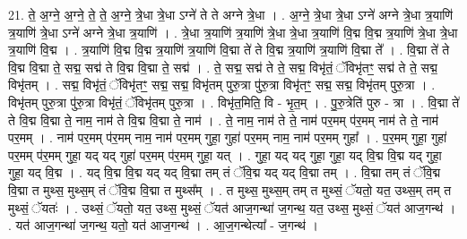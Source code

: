 \documentclass[17pt]{extarticle}
\begin{document}
21. ते॒ अ॒ग्ने॒ अ॒ग्ने॒ ते॒ ते॒ अ॒ग्ने॒ त्रे॒धा त्रे॒धा ऽग्ने॑ ते ते अग्ने त्रे॒धा । . अ॒ग्ने॒ त्रे॒धा त्रे॒धा ऽग्ने॑ अग्ने त्रे॒धा त्र॒याणि॑ त्र॒याणि॑ त्रे॒धा ऽग्ने॑ अग्ने त्रे॒धा त्र॒याणि॑ । . त्रे॒धा त्र॒याणि॑ त्र॒याणि॑ त्रे॒धा त्रे॒धा त्र॒याणि॑ वि॒द्म वि॒द्म त्र॒याणि॑ त्रे॒धा त्रे॒धा त्र॒याणि॑ वि॒द्म । . त्र॒याणि॑ वि॒द्म वि॒द्म त्र॒याणि॑ त्र॒याणि॑ वि॒द्मा ते॑ ते वि॒द्म त्र॒याणि॑ त्र॒याणि॑ वि॒द्मा ते᳚ । . वि॒द्मा ते॑ ते वि॒द्म वि॒द्मा ते॒ सद्म॒ सद्म॑ ते वि॒द्म वि॒द्मा ते॒ सद्म॑ । . ते॒ सद्म॒ सद्म॑ ते ते॒ सद्म॒ विभृ॑तं॒ ॅविभृ॑तꣳ॒॒ सद्म॑ ते ते॒ सद्म॒ विभृ॑तम् । . सद्म॒ विभृ॑तं॒ ॅविभृ॑तꣳ॒॒ सद्म॒ सद्म॒ विभृ॑तम् पुरु॒त्रा पु॑रु॒त्रा विभृ॑तꣳ॒॒ सद्म॒ सद्म॒ विभृ॑तम् पुरु॒त्रा । . विभृ॑तम् पुरु॒त्रा पु॑रु॒त्रा विभृ॑तं॒ ॅविभृ॑तम् पुरु॒त्रा । . विभृ॑त॒मिति॒ वि - भृ॒त॒म् । . पु॒रु॒त्रेति॑ पुरु - त्रा । . वि॒द्मा ते॑ ते वि॒द्म वि॒द्मा ते॒ नाम॒ नाम॑ ते वि॒द्म वि॒द्मा ते॒ नाम॑ । . ते॒ नाम॒ नाम॑ ते ते॒ नाम॑ पर॒मम् प॑र॒मम् नाम॑ ते ते॒ नाम॑ पर॒मम् । . नाम॑ पर॒मम् प॑र॒मम् नाम॒ नाम॑ पर॒मम् गुहा॒ गुहा॑ पर॒मम् नाम॒ नाम॑ पर॒मम् गुहा᳚ । . प॒र॒मम् गुहा॒ गुहा॑ पर॒मम् प॑र॒मम् गुहा॒ यद् यद् गुहा॑ पर॒मम् प॑र॒मम् गुहा॒ यत् । . गुहा॒ यद् यद् गुहा॒ गुहा॒ यद् वि॒द्म वि॒द्म यद् गुहा॒ गुहा॒ यद् वि॒द्म । . यद् वि॒द्म वि॒द्म यद् यद् वि॒द्मा तम् तं ॅवि॒द्म यद् यद् वि॒द्मा तम् । . वि॒द्मा तम् तं ॅवि॒द्म वि॒द्मा त मुथ्स॒ मुथ्स॒म् तं ॅवि॒द्म वि॒द्मा त मुथ्स᳚म् । . त मुथ्स॒ मुथ्स॒म् तम् त मुथ्सं॒ ॅयतो॒ यत॒ उथ्स॒म् तम् त मुथ्सं॒ ॅयतः॑ । . उथ्सं॒ ॅयतो॒ यत॒ उथ्स॒ मुथ्सं॒ ॅयत॑ आज॒गन्था॑ ज॒गन्थ॒ यत॒ उथ्स॒ मुथ्सं॒ ॅयत॑ आज॒गन्थ॑ । . यत॑ आज॒गन्था॑ ज॒गन्थ॒ यतो॒ यत॑ आज॒गन्थ॑ । . आ॒ज॒गन्थेत्या᳚ - ज॒गन्थ॑ । \newline
\end{document}
